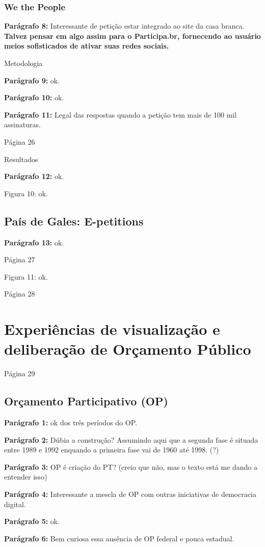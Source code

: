 \documentclass[12pt]{report}
\newcommand{\pp}[1]{

\textbf{Parágrafo #1:}
}
\begin{document}
\subsubsection{We the People}

\pp{8} Interessante de petição estar integrado ao site da casa branca. {\bf \color{red} Talvez pensar em algo assim para o Participa.br, fornecendo ao usuário meios sofisticados de ativar suas redes sociais.}

Metodologia

\pp{9} ok.

\pp{10} ok.

\pp{11} Legal das respostas quando a petição tem mais de 100 mil assinaturas.

\noindent Página 26

Resultados

\pp{12} ok.

Figura 10: ok.

\subsection{País de Gales: E-petitions}

\pp{13} ok.

\noindent Página 27

Figura 11: ok.

\noindent Página 28

\section{Experiências de visualização e deliberação de Orçamento Público}

\noindent Página 29

\subsection{Orçamento Participativo (OP)}

\pp{1} ok dos três períodos do OP.

\pp{2} Dúbia a construção? Assumindo aqui que a segunda fase é situada entre 1989 e 1992 enquando a primeira fase vai de 1960 até 1998. (?)

\pp{3} OP é criação do PT? (creio que não, mas o texto está me dando a entender isso)

\pp{4} Interessante a mescla de OP com outras iniciativas de democracia digital.

\pp{5} ok.

\pp{6} Bem curiosa essa ausência de OP federal e pouca estadual.
\end{document}
